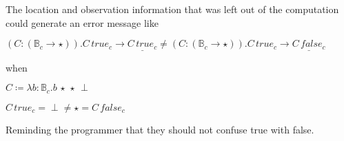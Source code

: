 The location and observation information that was left out of the computation could generate an error message like
 
$\left(C:\left(\mathbb{B}_{c}\rightarrow\star\right)\right).C\,true_{c}\rightarrow\underline{C\,true_{c}}\neq\left(C:\left(\mathbb{B}_{c}\rightarrow\star\right)\right).C\,true_{c}\rightarrow\underline{C\,false_{c}}$
 
when
 
$C\coloneqq\lambda b:\mathbb{B}_{c}.b\,\star\,\star\,\perp$
 
$C\,true_{c}=\perp\neq\star=C\,false_{c}$
 
Reminding the programmer that they should not confuse true with false.